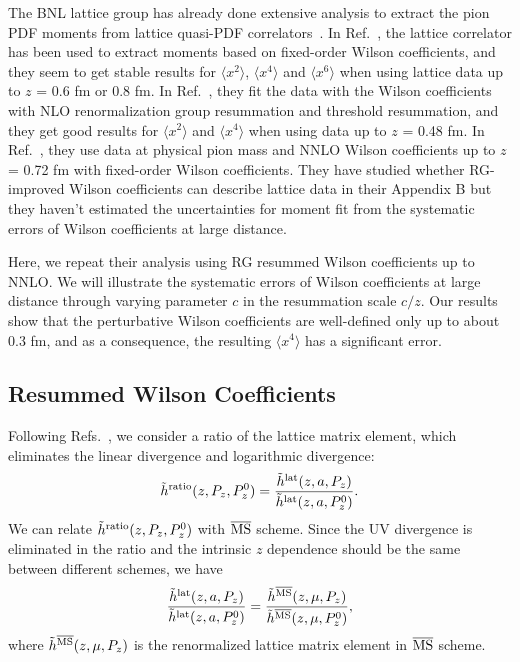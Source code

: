 \documentclass[prd,aps,twocolumn,preprintnumbers, showpacs, nofootinbib,superscriptaddress,notitlepage]{revtex4-2}
\def\bea{\begin{eqnarray}}
\def\eea{\end{eqnarray}}
\begin{document}
The BNL lattice group has already done extensive analysis to extract
the pion PDF moments from lattice quasi-PDF correlators~\cite{Gao:2020ito,Gao:2021hxl,Gao:2022iex}.
In Ref.~\cite{Gao:2020ito}, the lattice correlator has been used to extract moments based on fixed-order Wilson coefficients, and they seem to get stable results for $\langle x^2 \rangle$, $\langle x^4 \rangle$ and $\langle x^6 \rangle$ when using lattice data 
up to $z$ = 0.6 fm or 0.8 fm. In Ref.~\cite{Gao:2021hxl}, they fit the data with the Wilson coefficients with NLO renormalization group resummation and threshold resummation, and they get good results for $\langle x^2 \rangle$ and $\langle x^4 \rangle$ when using data up to $z$ = 0.48 fm. In Ref.~\cite{Gao:2022iex}, they use data at physical pion mass and NNLO Wilson coefficients up to $z$ = 0.72 fm with fixed-order Wilson coefficients. They have studied whether RG-improved Wilson coefficients can describe lattice data in their Appendix B but they haven't estimated the uncertainties for moment fit from the systematic errors of Wilson coefficients at large distance.

Here, we repeat their analysis using RG resummed Wilson coefficients up to NNLO. We will illustrate the systematic errors of Wilson coefficients at large distance through varying
parameter $c$ in the resummation scale $c/z$. Our results show that the
perturbative Wilson coefficients are well-defined only up to about 0.3 fm, and as
a consequence, the resulting $\langle x^4 \rangle$ has a significant error. 

\subsection{Resummed Wilson Coefficients}

Following Refs.~\cite{Radyushkin:2017cyf,Orginos:2017kos,Radyushkin:2017lvu,Joo:2019jct,Joo:2019bzr,Fan:2020nzz,Gao:2020ito}, we consider a ratio of the lattice matrix element, which eliminates the linear divergence and logarithmic divergence:
\bea\label{eq:ratio}
\tilde{h}^{\rm ratio}(z, P_{z}, P_{z}^0) = \frac{\tilde{h}^{\rm lat}(z, a, P_{z})}{\tilde{h}^{\rm lat}(z, a, P_{z}^0)}.
\eea
We can relate $\tilde{h}^{\rm ratio}(z, P_{z}, P_{z}^0)$ with $\overline{\rm MS}$ scheme. Since the UV divergence is eliminated in the ratio and the intrinsic $z$ dependence should be the same between different schemes, we have
\bea\label{eq:ratioMSbarfixedorder}
\frac{\tilde{h}^{\rm lat}(z, a, P_{z})}{\tilde{h}^{\rm lat}(z, a, P_{z}^0)} = \frac{\tilde{h}^{\overline{\rm MS}}(z, \mu, P_{z})}{\tilde{h}^{\overline{\rm MS}}(z, \mu, P_{z}^0)},
\eea
where $\tilde{h}^{\overline{\rm MS}}(z, \mu, P_{z})$ is the renormalized lattice matrix element in $\overline{\rm MS}$ scheme.
\end{document}
